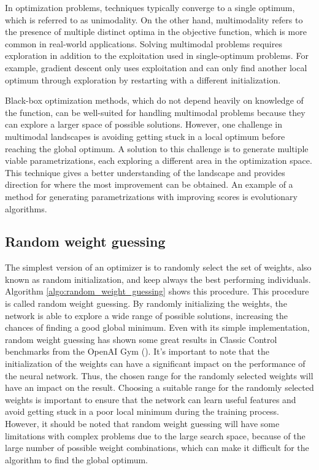 In optimization problems, techniques typically converge to a single optimum, which is referred to as unimodality. On the other hand, multimodality refers to the presence of multiple distinct optima in the objective function, which is more common in real-world applications. Solving multimodal problems requires exploration in addition to the exploitation used in single-optimum problems. For example, gradient descent only uses exploitation and can only find another local optimum through exploration by restarting with a different initialization.

Black-box optimization methods, which do not depend heavily on knowledge of the function, can be well-suited for handling multimodal problems because they can explore a larger space of possible solutions. However, one challenge in multimodal landscapes is avoiding getting stuck in a local optimum before reaching the global optimum. A solution to this challenge is to generate multiple viable parametrizations, each exploring a different area in the optimization space. This technique gives a better understanding of the landscape and provides direction for where the most improvement can be obtained. An example of a method for generating parametrizations with improving scores is evolutionary algorithms.

\subsection{Random weight guessing}
The simplest version of an optimizer is to randomly select the set of weights, also known as random initialization, and keep always the best performing individuals. Algorithm \ref{algo:random_weight_guessing} shows this procedure. This procedure is called random weight guessing. By randomly initializing the weights, the network is able to explore a wide range of possible solutions, increasing the chances of finding a good global minimum. Even with its simple implementation, random weight guessing has shown some great results in Classic Control benchmarks from the OpenAI Gym (\cite{oller_analyzing_2020}). It's important to note that the initialization of the weights can have a significant impact on the performance of the neural network. Thus, the chosen range for the randomly selected weights will have an impact on the result. Choosing a suitable range for the randomly selected weights is important to ensure that the network can learn useful features and avoid getting stuck in a poor local minimum during the training process. However, it should be noted that random weight guessing will have some limitations with complex problems due to the large search space, because of the large number of possible weight combinations, which can make it difficult for the algorithm to find the global optimum.

